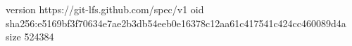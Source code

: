 version https://git-lfs.github.com/spec/v1
oid sha256:e5169bf3f70634e7ae2b3db54eeb0e16378c12aa61c417541c424cc460089d4a
size 524384
